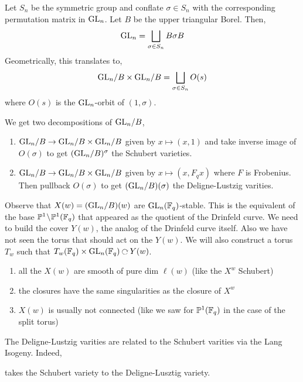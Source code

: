 \documentclass[12pt]{article}
\begin{document}
\begin{exercise}
Let $S_n$ be the symmetric group and conflate $\sigma \in S_n$ with the corresponding permutation matrix in $\mathrm{GL}_n$. Let $B$ be the upper triangular Borel. Then,
\[ \mathrm{GL}_n = \bigsqcup_{\sigma \in S_n} B \sigma B \]
Geometrically, this translates to,
\[ \mathrm{GL}_n / B \times \mathrm{GL}_n / B = \bigsqcup_{\sigma \in S_n} O(s) \]
where $O(s)$ is the $\mathrm{GL}_n$-orbit of $(1, \sigma)$. 
\end{exercise}

We get two decompositions of $\mathrm{GL}_n / B$,
\begin{enumerate}
\item $\mathrm{GL}_n  / B \to \mathrm{GL}_n / B \times \mathrm{GL}_n / B$ given by $x \mapsto (x,1)$ and take inverse image of $O(\sigma)$ to get $(\mathrm{GL}_n/B)^\sigma$ the Schubert varieties. 

\item $\mathrm{GL}_n / B \to \mathrm{GL}_n / B \times \mathrm{GL}_n / B$ given by $x \mapsto (x, F_q x)$ where $F$ is Frobenius. Then pullback $O(\sigma)$ to get $(\mathrm{GL}_n / B)(\sigma)$ the Deligne-Lustzig varities.  
\end{enumerate}
Observe that $X(w) = (\mathrm{GL}_n / B)(w)$ are $\mathrm{GL}_n(\mathbb{F}_q)$-stable. This is the equivalent of the base $\mathbb{P}^1 \! \setminus \! \mathbb{P}^1(\mathbb{F}_q)$ that appeared as the quotient of the Drinfeld curve. We need to build the cover $Y(w)$, the analog of the Drinfeld curve itself. Also we have not seen the torus that should act on the $Y(w)$. We will also construct a torus $T_w$ such that $T_w(\FF_q) \times \GL_n(\FF_q) \acts Y(w)$. 

\begin{prop}
\begin{enumerate}
\item all the $X(w)$ are smooth of pure dim $\ell(w)$ (like the $X^w$ Schubert)

\item the closures have the same singularities as the closure of $X^w$

\item $X(w)$ is usually not connected (like we saw for $\mathbb{P}^1(\mathbb{F}_q)$ in the case of the split torus)
\end{enumerate}
\end{prop} 

\begin{rmk}
The Deligne-Lustzig varities are related to the Schubert varities via the Lang Isogeny. Indeed,
\begin{center}
\end{center}
takes the Schubert variety to the Deligne-Lusztig variety. 
\end{rmk}
\end{document}
